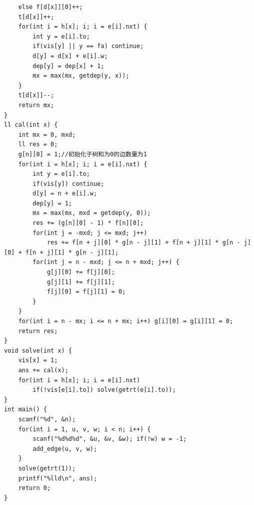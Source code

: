 \documentclass[10pt]{ctexart}
\begin{document}
{\begin{lstlisting}
    else f[d[x]][0]++;
    t[d[x]]++;
    for(int i = h[x]; i; i = e[i].nxt) {
        int y = e[i].to;
        if(vis[y] || y == fa) continue;
        d[y] = d[x] + e[i].w;
        dep[y] = dep[x] + 1;
        mx = max(mx, getdep(y, x));
    }
    t[d[x]]--;
    return mx;
}
ll cal(int x) {
    int mx = 0, mxd;
    ll res = 0;
    g[n][0] = 1;//初始化子树和为0的边数量为1
    for(int i = h[x]; i; i = e[i].nxt) {
        int y = e[i].to;
        if(vis[y]) continue;
        d[y] = n + e[i].w;
        dep[y] = 1;
        mx = max(mx, mxd = getdep(y, 0));
        res += (g[n][0] - 1) * f[n][0];
        for(int j = -mxd; j <= mxd; j++)
            res += f[n + j][0] * g[n - j][1] + f[n + j][1] * g[n - j][0] + f[n + j][1] * g[n - j][1];
        for(int j = n - mxd; j <= n + mxd; j++) {
            g[j][0] += f[j][0];
            g[j][1] += f[j][1];
            f[j][0] = f[j][1] = 0;
        }
    }
    for(int i = n - mx; i <= n + mx; i++) g[i][0] = g[i][1] = 0;
    return res;
}
void solve(int x) {
    vis[x] = 1;
    ans += cal(x);
    for(int i = h[x]; i; i = e[i].nxt)
        if(!vis[e[i].to]) solve(getrt(e[i].to));
}
int main() {
    scanf("%d", &n);
    for(int i = 1, u, v, w; i < n; i++) {
        scanf("%d%d%d", &u, &v, &w); if(!w) w = -1;
        add_edge(u, v, w);
    }
    solve(getrt(1));
    printf("%lld\n", ans);
    return 0;
}
\end{lstlisting}

}
\end{document}

